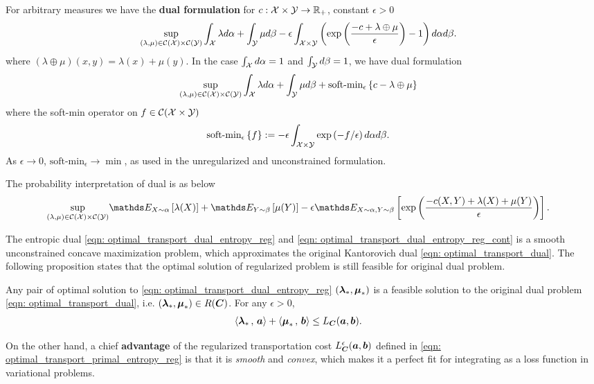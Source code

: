 \documentclass[11pt]{article}
\begin{document}
For arbitrary measures we have the \textbf{dual formulation} for $c: {\mathcal X} \times {\mathcal Y} \rightarrow {\mathbb R}_{+}$, constant $\epsilon >0$
\begin{align}
\sup_{(\lambda,\mu) \in {\mathcal C}({\mathcal X}) \times {\mathcal C}({\mathcal Y})} & \int_{{\mathcal X}}\lambda d\alpha  + \int_{{\mathcal Y}}\mu d\beta  - \epsilon \int_{{\mathcal X} \times {\mathcal Y}}\left(\exp\left(\frac{-c + \lambda \oplus \mu}{\epsilon}\right) - 1\right)d\alpha d\beta.  \label{eqn: optimal_transport_dual_entropy_reg_cont}
\end{align} where $(\lambda \oplus \mu)(x, y) = \lambda(x) + \mu(y)$.
In the case $\int_{{\mathcal X}}d\alpha = 1$ and $\int_{{\mathcal Y}}d\beta = 1$, we have dual formulation
\begin{align}
\sup_{(\lambda,\mu) \in {\mathcal C}({\mathcal X}) \times {\mathcal C}({\mathcal Y})} & \int_{{\mathcal X}}\lambda d\alpha + \int_{{\mathcal Y}}\mu  d\beta  + \text{soft-min}_{\epsilon}\left\{c - \lambda \oplus \mu\right\} \label{eqn: optimal_transport_dual_softmin_cont}
\end{align} where the soft-min operator on $f \in {\mathcal C}({\mathcal X} \times {\mathcal Y})$
\begin{align}
\text{soft-min}_{\epsilon}\left\{f\right\} &:= -\epsilon \int_{{\mathcal X} \times {\mathcal Y}}\exp\left(- f/\epsilon\right)d\alpha d\beta.
\end{align} As $\epsilon \rightarrow 0$, $\text{soft-min}_{\epsilon} \rightarrow \min$, as used in the unregularized and unconstrained formulation. 

The probability interpretation of dual is as below
\begin{align}
\sup_{(\lambda,\mu) \in \cC(\cX) \times \cC(\cY)} & \E{X \sim \alpha }{\lambda(X)}  + \E{Y \sim \beta}{\mu(Y)}  - \epsilon \E{X \sim \alpha, Y \sim \beta}{\exp\paren{\frac{-c(X,Y) + \lambda(X)+ \mu(Y)}{\epsilon}}}.  \label{eqn: optimal_transport_dual_entropy_prob}
\end{align}

The entropic dual \eqref{eqn: optimal_transport_dual_entropy_reg} and \eqref{eqn: optimal_transport_dual_entropy_reg_cont} is a smooth unconstrained concave maximization problem, which approximates the original Kantorovich dual \eqref{eqn: optimal_transport_dual}. The following proposition states that the optimal solution of regularized problem is still feasible for original dual problem. 
\begin{proposition}
Any pair of optimal solution to \eqref{eqn: optimal_transport_dual_entropy_reg} $(\boldsymbol{\lambda}_{*}, \boldsymbol{\mu}_{*})$ is a feasible solution to the original dual problem \eqref{eqn: optimal_transport_dual}, i.e. $(\boldsymbol{\lambda}_{*}, \boldsymbol{\mu}_{*}) \in R(\boldsymbol{C})$. For any $\epsilon >0$, 
\begin{align*}
\left\langle \boldsymbol{\lambda}_{*}\,,\, \boldsymbol{a} \right\rangle + \left\langle \boldsymbol{\mu}_{*}\,,\, \boldsymbol{b} \right\rangle &\le L_{\boldsymbol{C}}(\boldsymbol{a}, \boldsymbol{b}).
\end{align*}
\end{proposition}
On the other hand, a chief \textbf{advantage} of the regularized transportation cost $L_{\boldsymbol{C}}^{\epsilon}(\boldsymbol{a}, \boldsymbol{b}) $ defined in \eqref{eqn: optimal_transport_primal_entropy_reg} is that it is \emph{smooth} and \emph{convex}, which makes it a perfect fit for integrating as a loss function in variational problems.
\end{document}
